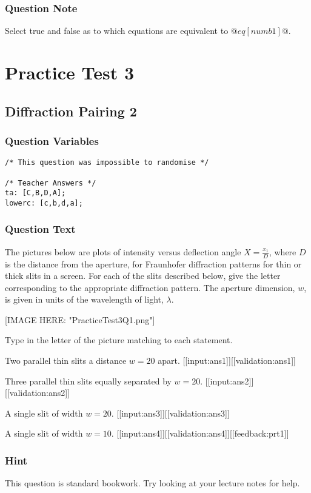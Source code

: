 \documentclass[a4paper,10pt]{article}
\begin{document}
\subsubsection{Question Note}
Select true and false as to which equations are equivalent to $@eq[numb1]@$.

\section{Practice Test 3}
\subsection{Diffraction Pairing 2}
\subsubsection{Question Variables}
\begin{lstlisting}
/* This question was impossible to randomise */

/* Teacher Answers */
ta: [C,B,D,A];
lowerc: [c,b,d,a];
\end{lstlisting}
\subsubsection{Question Text}
The pictures below are plots of intensity versus deflection angle $X = \frac{x_1}{D}$, where $D$ is the distance from the aperture, for Fraunhofer diffraction patterns for thin or thick slits in a screen. For each of the slits described below, give the letter corresponding to the appropriate diffraction pattern. The aperture dimension, $w$, is given in units of the wavelength of light, $\lambda$.

[IMAGE HERE: "PracticeTest3Q1.png"]

Type in the letter of the picture matching to each statement.

Two parallel thin slits a distance $w=20$ apart.   [[input:ans1]][[validation:ans1]]

Three parallel thin slits equally separated by $w=20$.   [[input:ans2]][[validation:ans2]]

A single slit of width $w=20$.   [[input:ans3]][[validation:ans3]]

A single slit of width $w=10$.   [[input:ans4]][[validation:ans4]][[feedback:prt1]]
\subsubsection{Hint}
This question is standard bookwork. Try looking at your lecture notes for help.
\end{document}
